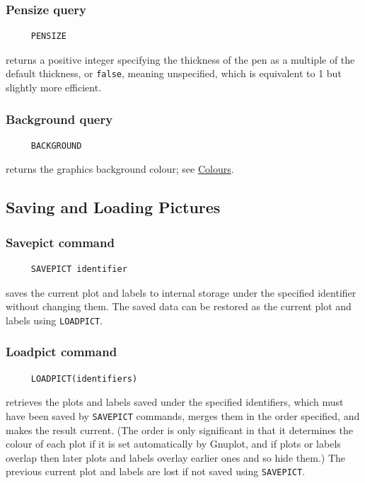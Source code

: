 \subsubsection*{Pensize query}
\begin{verbatim}
     PENSIZE
\end{verbatim}
returns a positive integer specifying the thickness of the pen as a
multiple of the default thickness, or \texttt{false}, meaning
unspecified, which is equivalent to 1 but slightly more efficient.

\subsubsection*{Background query}
\begin{verbatim}
     BACKGROUND
\end{verbatim}
returns the graphics background colour; see
\hyperref[logoturtle:Colours]{Colours}.


\subsection{Saving and Loading Pictures}

\subsubsection*{Savepict command}
\begin{verbatim}
     SAVEPICT identifier
\end{verbatim}
\label{logoturtle:savepict}
saves the current plot and labels to internal storage under the
specified identifier without changing them.  The saved data can be
restored as the current plot and labels using \texttt{LOADPICT}.

\subsubsection*{Loadpict command}
\begin{verbatim}
     LOADPICT(identifiers)
\end{verbatim}
retrieves the plots and labels saved under the specified identifiers,
which must have been saved by \texttt{SAVEPICT} commands, merges them
in the order specified, and makes the result current. (The order is
only significant in that it determines the colour of each plot if it
is set automatically by Gnuplot, and if plots or labels overlap then
later plots and labels overlay earlier ones and so hide them.)  The
previous current plot and labels are lost if not saved using
\texttt{SAVEPICT}.
